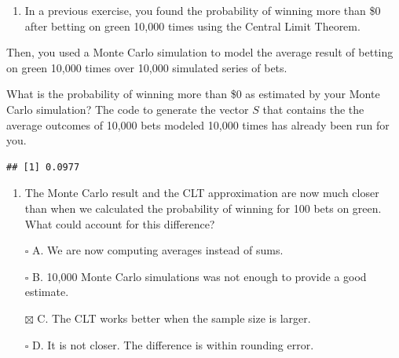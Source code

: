 \documentclass[
]{article}
\newenvironment{Shaded}{\begin{snugshade}}{\end{snugshade}}
\newcommand{\CommentTok}[1]{\textcolor[rgb]{0.56,0.35,0.01}{\textit{#1}}}
\newcommand{\DecValTok}[1]{\textcolor[rgb]{0.00,0.00,0.81}{#1}}
\newcommand{\KeywordTok}[1]{\textcolor[rgb]{0.13,0.29,0.53}{\textbf{#1}}}
\newcommand{\NormalTok}[1]{#1}
\newcommand{\OperatorTok}[1]{\textcolor[rgb]{0.81,0.36,0.00}{\textbf{#1}}}
\providecommand{\tightlist}{%
  \setlength{\itemsep}{0pt}\setlength{\parskip}{0pt}}
\begin{document}
\begin{enumerate}
\def\labelenumi{\arabic{enumi}.}
\setcounter{enumi}{9}
\tightlist
\item
  In a previous exercise, you found the probability of winning more than
  \$0 after betting on green 10,000 times using the Central Limit
  Theorem.
\end{enumerate}

Then, you used a Monte Carlo simulation to model the average result of
betting on green 10,000 times over 10,000 simulated series of bets.

What is the probability of winning more than \$0 as estimated by your
Monte Carlo simulation? The code to generate the vector \(S\) that
contains the the average outcomes of 10,000 bets modeled 10,000 times
has already been run for you.

\begin{Shaded}
\end{Shaded}

\begin{verbatim}
## [1] 0.0977
\end{verbatim}

\begin{enumerate}
\def\labelenumi{\arabic{enumi}.}
\setcounter{enumi}{10}
\tightlist
\item
  The Monte Carlo result and the CLT approximation are now much closer
  than when we calculated the probability of winning for 100 bets on
  green. What could account for this difference?
\end{enumerate}

\begin{itemize}
\tightlist
\item[$\square$]
  A. We are now computing averages instead of sums.
\item[$\square$]
  B. 10,000 Monte Carlo simulations was not enough to provide a good
  estimate.
\item[$\boxtimes$]
  C. The CLT works better when the sample size is larger.
\item[$\square$]
  D. It is not closer. The difference is within rounding error.
\end{itemize}
\end{document}
